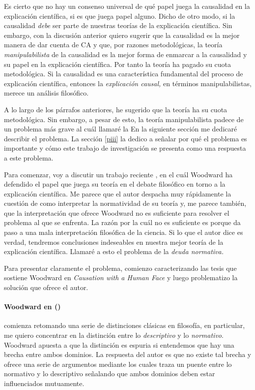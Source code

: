 Es cierto que no hay un consenso universal de qué papel
juega la causalidad en la explicación científica, si es que
juega papel alguno. Dicho de otro modo, si la causalidad
\emph{debe} ser parte de nuestras teorías de la
explicación científica. Sin embargo, con la discusión
anterior quiero sugerir que la causalidad es la mejor manera
de dar cuenta de CA y que, por razones metodológicas, la
teoría \emph{manipulabilista} de la causalidad es la mejor
forma de enmarcar a la causalidad y su papel en la
explicación científica. Por tanto la teoría ha pagado su
cuota metodológica. Si la causalidad es una característica
fundamental del proceso de explicación científica, entonces
la \emph{explicación causal,} en términos manipulabilistas,
merece un análisis filosófico.

A lo largo de los párrafos anteriores, he sugerido que la
teoría ha  su cuota metodológica. 
Sin embargo, a pesar de esto, la teoría 
manipulabilista padece de un problema más grave al cuál 
llamaré la  En la siguiente sección me
dedicaré describir el problema. La sección \ref{piii} la
dedico a señalar por qué el problema es importante y cómo este
trabajo de investigación se presenta como una respuesta a este problema. 

Para comenzar, voy a
discutir un trabajo reciente , en el
cuál Woodward ha defendido el papel que juega su teoría en
el debate filosófico en torno a la explicación científica.
Me parece que el autor despacha muy rápidamente la cuestión
de como interpretar la normatividad de su teoría y, me
parece también, que la interpretación que ofrece Woodward no
es suficiente para resolver el problema al que se enfrenta.
La razón por la cuál no es suficiente es porque da paso a
una mala interpretación filosófica de la ciencia. Si lo que
el autor dice es verdad, tendremos conclusiones indeseables
en nuestra mejor teoría de la explicación científica.
Llamaré a esto el problema de la \emph{deuda
normativa.}

Para presentar claramente el problema, comienzo
caracterizando las tesis que sostiene
Woodward en \emph{Causation with a Human Face} y luego problematizo la
solución que ofrece el autor. 

\paragraph{Woodward en (\citeyear{caushuman})} comienza
retomando una serie de distinciones clásicas en filosofía,
en particular, me quiero concentrar en la distinción entre lo \emph{descriptivo} y lo
\emph{normativo}. Woodward apuesta a que la distinción es
espuria si entendemos que hay una brecha entre ambos
dominios. La respuesta del autor es que no existe
tal brecha y ofrece una serie de argumentos mediante los
cuales traza un puente entre lo normativo y lo descriptivo
señalando que ambos dominios deben estar influenciados
mutuamente.

